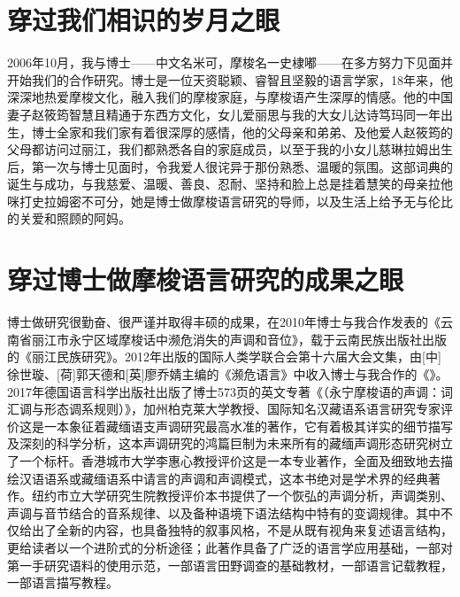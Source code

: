\section*{穿过我们相识的岁月之眼}

2006年10月，我与博士——中文名米可，摩梭名一史棣嘟——在多方努力下见面并开始我们的合作研究。博士是一位天资聪颖、睿智且坚毅的语言学家，18年来，他深深地热爱摩梭文化，融入我们的摩梭家庭，与摩梭语产生深厚的情感。他的中国妻子赵筱筠智慧且精通于东西方文化，女儿爱丽思与我的大女儿达诗笃玛同一年出生，博士全家和我们家有着很深厚的感情，他的父母亲和弟弟、及他爱人赵筱筠的父母都访问过丽江，我们都熟悉各自的家庭成员，以至于我的小女儿慈琳拉姆出生后，第一次与博士见面时，令我爱人很诧异于那份熟悉、温暖的氛围。这部词典的诞生与成功，与我慈爱、温暖、善良、忍耐、坚持和脸上总是挂着慧笑的母亲拉他咪打史拉姆密不可分，她是博士做摩梭语言研究的导师，以及生活上给予无与伦比的关爱和照顾的阿妈。

\section*{穿过博士做摩梭语言研究的成果之眼}

博士做研究很勤奋、很严谨并取得丰硕的成果，在2010年博士与我合作发表的《云南省丽江市永宁区域摩梭话中濒危消失的声调和音位》，载于云南民族出版社出版的《丽江民族研究》。2012年出版的国际人类学联合会第十六届大会文集，由[中]徐世璇、[荷]郭天德和[英]廖乔婧主编的《濒危语言》中收入博士与我合作的《》。2017年德国语言科学出版社出版了博士573页的英文专著《（永宁摩梭语的声调：词汇调与形态调系规则）》，加州柏克莱大学教授、国际知名汉藏语系语言研究专家评价这是一本象征着藏缅语支声调研究最高水准的著作，它有着极其详实的细节描写及深刻的科学分析，这本声调研究的鸿篇巨制为未来所有的藏缅声调形态研究树立了一个标杆。香港城市大学李惠心教授评价这是一本专业著作，全面及细致地去描绘汉语语系或藏缅语系中请言的声调和声调模式，这本书绝对是学术界的经典著作。纽约市立大学研究生院教授评价本书提供了一个恢弘的声调分析，声调类别、声调与音节结合的音系规律、以及备种语境下语法结构中特有的变调规律。其中不仅给出了全新的内容，也具备独特的叙事风格，不是从既有视角来复述语言结构，更给读者以一个进阶式的分析途径；此著作具备了广泛的语言学应用基础，一部对第一手研究语料的使用示范，一部语言田野调查的基础教材，一部语言记载教程，一部语言描写教程。

